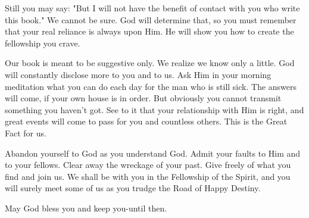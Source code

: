 \begin{biblechapter}
Still you may say: "But I will not have the benefit of contact with you who write this book."  We cannot be sure.  God will determine that, so you must remember that your real reliance is always upon Him.  He will show you how to create the fellowship you crave.

Our book is meant to be suggestive only.  We realize we know only a little.  God will constantly disclose more to you and to us.  Ask Him in your morning meditation what you can do each day for the man who is still sick.  The answers will come, if your own house is in order.  But obviously you cannot transmit something you haven't got.  See to it that your relationship with Him is right, and great events will come to pass for you and countless others.  This is the Great Fact for us.

Abandon yourself to God as you understand God.  Admit your faults to Him and to your fellows.  Clear away the wreckage of your past.  Give freely of what you find and join us.  We shall be with you in the Fellowship of the Spirit, and you will surely meet some of us as you trudge the Road of Happy Destiny.

May God bless you and keep you-until then.

\end{biblechapter}

